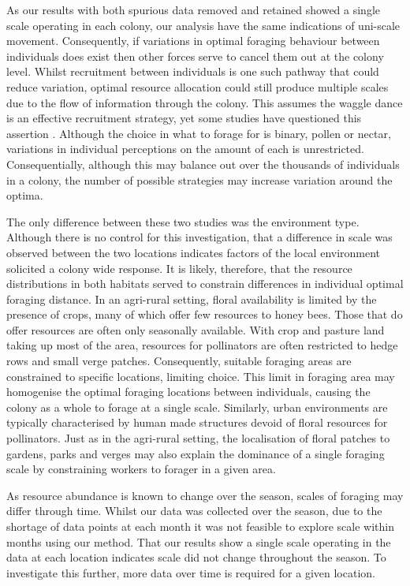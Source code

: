 \documentclass[11pt,usenames,dvipsnames]{article}
\begin{document}
As our results with both spurious data removed and retained showed a single scale operating in each colony, our analysis have the same indications of uni-scale movement. Consequently, if variations in optimal foraging behaviour between individuals does exist then other forces serve to cancel them out at the colony level. Whilst recruitment between individuals is one such pathway that could reduce variation, optimal resource allocation could still produce multiple scales due to the flow of information through the colony. This assumes the waggle dance is an effective recruitment strategy, yet some studies have questioned this assertion \citep{Gruter2008, Gruter2009}. Although the choice in what to forage for is binary, pollen or nectar, variations in individual perceptions on the amount of each is unrestricted. Consequentially, although this may balance out over the thousands of individuals in a colony, the number of possible strategies may increase variation around the optima.

The only difference between these two studies was the environment type. Although there is no control for this investigation, that a difference in scale was observed between the two locations indicates factors of the local environment solicited a colony wide response. It is likely, therefore, that the resource distributions in both habitats served to constrain differences in individual optimal foraging distance. In an agri-rural setting, floral availability is limited by the presence of crops, many of which offer few resources to honey bees. Those that do offer resources are often only seasonally available. With crop and pasture land taking up most of the area, resources for pollinators are often restricted to hedge rows and small verge patches. Consequently, suitable foraging areas are constrained to specific locations, limiting choice. This limit in foraging area may homogenise the optimal foraging locations between individuals, causing the colony as a whole to forage at a single scale. Similarly, urban environments are typically characterised by human made structures devoid of floral resources for pollinators. Just as in the agri-rural setting, the localisation of floral patches to gardens, parks and verges may also explain the dominance of a single foraging scale by constraining workers to forager in a given area. 

As resource abundance is known to change over the season, scales of foraging may differ through time. Whilst our data was collected over the season, due to the shortage of data points at each month it was not feasible to explore scale within months using our method. That our results show a single scale operating in the data at each location indicates scale did not change throughout the season. To investigate this further, more data over time is required for a given location.
\end{document}
